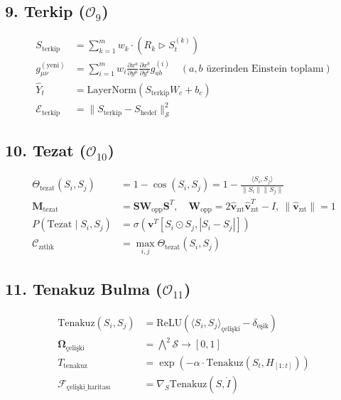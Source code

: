 \documentclass[11pt, a4paper]{article}
\begin{document}
\subsection{9. Terkip ($\mathcal{O}_9$)}
\begin{align}
S_{\text{terkip}} &= \sum_{k=1}^m w_k \cdot \left( R_k \triangleright S_t^{(k)} \right) \\
g_{\mu\nu}^{(\text{yeni})} &= \sum_{i=1}^m w_i \frac{\partial x^a}{\partial y^\mu} \frac{\partial x^b}{\partial y^\nu} g_{ab}^{(i)} \quad (a, b \text{ üzerinden Einstein toplamı}) \\
\hat{Y}_t &= \text{LayerNorm}(S_{\text{terkip}} W_c + b_c) \\
\mathcal{E}_{\text{terkip}} &= \| S_{\text{terkip}} - S_{\text{hedef}} \|_{\mathcal{S}}^2
\end{align}

\subsection{10. Tezat ($\mathcal{O}_{10}$)}
\begin{align}
\Theta_{\text{tezat}}(S_i, S_j) &= 1 - \cos(S_i, S_j) = 1 - \frac{\langle S_i, S_j \rangle}{\|S_i\| \|S_j\|} \\
\mathbf{M}_{\text{tezat}} &= \mathbf{S} \mathbf{W}_{\text{opp}} \mathbf{S}^T, \quad \mathbf{W}_{\text{opp}} = 2\hat{\mathbf{v}}_{\text{zıt}}\hat{\mathbf{v}}_{\text{zıt}}^T - I, \ \|\hat{\mathbf{v}}_{\text{zıt}}\| = 1 \\
P(\text{Tezat} \mid S_i, S_j) &= \sigma\left( \mathbf{v}^T [S_i \odot S_j, |S_i - S_j|] \right) \\
\mathcal{C}_{\text{zıtlık}} &= \max_{i,j} \Theta_{\text{tezat}}(S_i, S_j)
\end{align}

\subsection{11. Tenakuz Bulma ($\mathcal{O}_{11}$)}
\begin{align}
\text{Tenakuz}(S_i, S_j) &= \text{ReLU}\left( \langle S_i, S_j \rangle_{\text{çelişki}} - \delta_{\text{eşik}} \right) \\
\mathbf{\Omega}_{\text{çelişki}} &= \bigwedge^2 \mathcal{S} \to [0, 1] \\
T_{\text{tenakuz}} &= \exp\left( -\alpha \cdot \text{Tenakuz}(S_t, H_{[1:t]}) \right) \\
\mathcal{F}_{\text{çelişki\_haritası}} &= \nabla_S \text{Tenakuz}(S, \dot{I})
\end{align}
\end{document}
